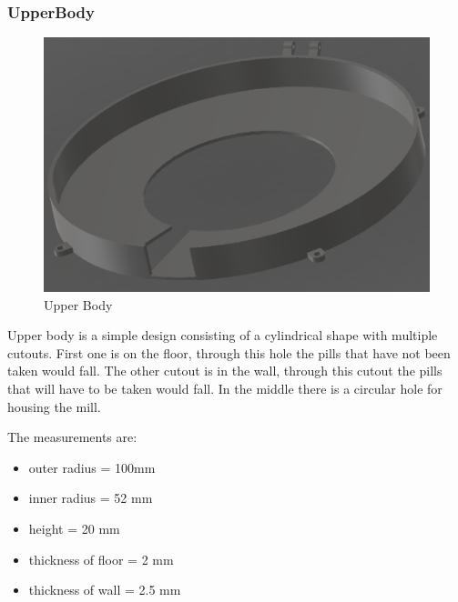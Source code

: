 \subsubsection{UpperBody}
\begin{figure}[h]
	\centering
	\includegraphics[width=0.7\linewidth]{Figures/Screenshot_6}
	\caption[Upper Body]{Upper Body}
	\label{fig:screenshot6}
\end{figure}
Upper body is a simple design consisting of a cylindrical shape with multiple cutouts. First one is on the floor, through this hole the pills that have not been taken would fall. The other cutout is in the wall, through this cutout the pills that will have to be taken would fall. In the middle there is a circular hole for housing the mill. 

The measurements are:
\begin{itemize}
	\item outer radius = 100mm
	\item inner radius = 52 mm
	\item height = 20 mm
	\item thickness of floor = 2 mm
	\item thickness of wall = 2.5 mm 
\end{itemize}
\newpage
